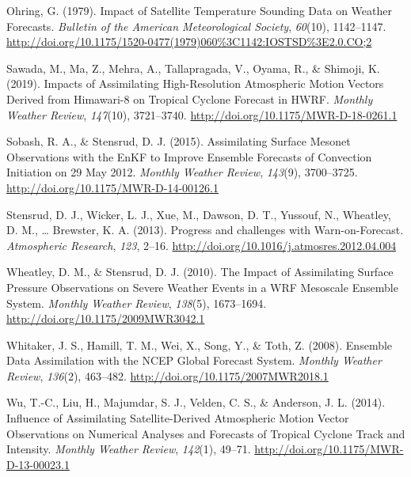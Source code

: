 \documentclass[12pt,twoside]{reedthesis}
\begin{document}
\leavevmode\hypertarget{ref-ohring1979}{}%
Ohring, G. (1979). Impact of Satellite Temperature Sounding Data on Weather Forecasts. \emph{Bulletin of the American Meteorological Society}, \emph{60}(10), 1142--1147. \url{http://doi.org/10.1175/1520-0477(1979)060\%3C1142:IOSTSD\%3E2.0.CO;2}

\leavevmode\hypertarget{ref-sawada2019}{}%
Sawada, M., Ma, Z., Mehra, A., Tallapragada, V., Oyama, R., \& Shimoji, K. (2019). Impacts of Assimilating High-Resolution Atmospheric Motion Vectors Derived from Himawari-8 on Tropical Cyclone Forecast in HWRF. \emph{Monthly Weather Review}, \emph{147}(10), 3721--3740. \url{http://doi.org/10.1175/MWR-D-18-0261.1}

\leavevmode\hypertarget{ref-sobash2015}{}%
Sobash, R. A., \& Stensrud, D. J. (2015). Assimilating Surface Mesonet Observations with the EnKF to Improve Ensemble Forecasts of Convection Initiation on 29 May 2012. \emph{Monthly Weather Review}, \emph{143}(9), 3700--3725. \url{http://doi.org/10.1175/MWR-D-14-00126.1}

\leavevmode\hypertarget{ref-stensrud2013}{}%
Stensrud, D. J., Wicker, L. J., Xue, M., Dawson, D. T., Yussouf, N., Wheatley, D. M., \ldots{} Brewster, K. A. (2013). Progress and challenges with Warn-on-Forecast. \emph{Atmospheric Research}, \emph{123}, 2--16. \url{http://doi.org/10.1016/j.atmosres.2012.04.004}

\leavevmode\hypertarget{ref-wheatley2010}{}%
Wheatley, D. M., \& Stensrud, D. J. (2010). The Impact of Assimilating Surface Pressure Observations on Severe Weather Events in a WRF Mesoscale Ensemble System. \emph{Monthly Weather Review}, \emph{138}(5), 1673--1694. \url{http://doi.org/10.1175/2009MWR3042.1}

\leavevmode\hypertarget{ref-whitaker2008}{}%
Whitaker, J. S., Hamill, T. M., Wei, X., Song, Y., \& Toth, Z. (2008). Ensemble Data Assimilation with the NCEP Global Forecast System. \emph{Monthly Weather Review}, \emph{136}(2), 463--482. \url{http://doi.org/10.1175/2007MWR2018.1}

\leavevmode\hypertarget{ref-wu2014}{}%
Wu, T.-C., Liu, H., Majumdar, S. J., Velden, C. S., \& Anderson, J. L. (2014). Influence of Assimilating Satellite-Derived Atmospheric Motion Vector Observations on Numerical Analyses and Forecasts of Tropical Cyclone Track and Intensity. \emph{Monthly Weather Review}, \emph{142}(1), 49--71. \url{http://doi.org/10.1175/MWR-D-13-00023.1}


\end{document}
